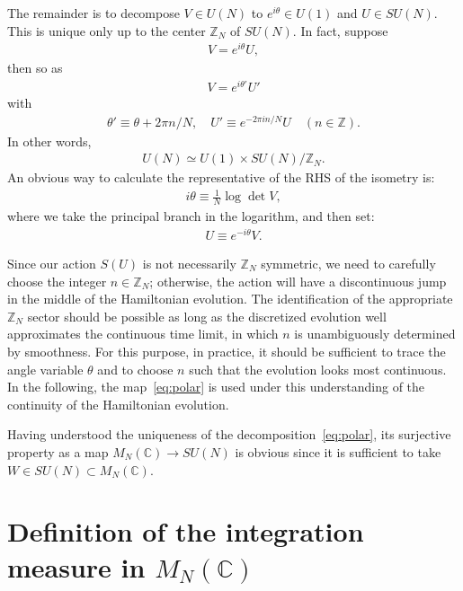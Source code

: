 \documentclass[12pt]{article}
\begin{document}
The remainder is to decompose $V \in U(N)$
to $e^{i\theta} \in U(1)$ and $U \in SU(N)$.
This is unique only up to the center $\mathbb{Z}_{N}$ of $SU(N)$.
In fact, suppose
\begin{align}
  V = e^{i \theta} U,
\end{align}
then so as
\begin{align}
  V = e^{i \theta'} U'
\end{align}
with
\begin{align}
  \theta' \equiv \theta + 2\pi n/N,
  \quad
  U' \equiv e^{-2\pi i n/N} U
  \quad (n \in \mathbb{Z}).
\end{align}
In other words,
\begin{align}
  U(N) \simeq U(1) \times SU(N) / \mathbb{Z}_{N}.
\end{align}
An obvious way to calculate the representative of the RHS of the isometry is:
\begin{align}
  i\theta \equiv \frac{1}{N} \log \det V,
\end{align}
where we take the principal branch in the logarithm,
and then set:
\begin{align}
  U \equiv e^{-i\theta} V.
\end{align}

Since our action $S(U)$ is not necessarily $\mathbb{Z}_{N}$ symmetric,
we need to carefully choose the integer $n \in \mathbb{Z}_{N}$;
otherwise, the action will have a discontinuous jump in the middle of
the Hamiltonian evolution.
The identification of the appropriate $\mathbb{Z}_{N}$ sector
should be possible as long as
the discretized evolution well approximates the continuous time limit,
in which $n$ is unambiguously determined by smoothness.
For this purpose, in practice, it should be sufficient to trace
the angle variable $\theta$
and to choose $n$ such that the evolution looks most continuous.
In the following, the map~\eqref{eq:polar}
is used under this understanding of the continuity of the Hamiltonian evolution.

Having understood the uniqueness of the decomposition~\eqref{eq:polar},
its surjective property as a map $M_N(\mathbb{C}) \to SU(N)$ is obvious
since it is sufficient to take $W \in SU(N) \subset M_N(\mathbb{C})$.


\section{Definition of the integration measure in $M_N(\mathbb{C})$}
\label{sec:measure}
\end{document}
